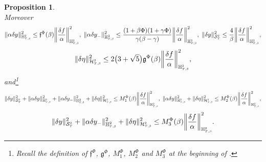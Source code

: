 \documentclass[10pt]{article} %
\newtheorem{proposition}[theorem]{Proposition}
\newcommand\cH{\mathcal H}
\newcommand\cS{\mathcal S}
\newcommand{\smalltext}[1]{\text{\fontsize{4}{4}\selectfont$#1$}}
\newcommand\ff{\mathfrak f}
\newcommand\fg{\mathfrak g}
\def \H{\mathbb{H}}
\newcommand{\etaconst}{2\big(3 + \sqrt{5}\big)}
\begin{document}
\begin{proposition}
\begin{equation*}
	\end{equation*}
	Moreover
	\begin{equation*}
			\|\alpha \delta y\|^2_{\H^{\smalltext{2}}_{\smalltext{T}\smalltext{,}\smalltext{\beta}}} 
			\leq \ff^\Phi(\beta) \bigg\| \frac{\delta f}{\alpha} \bigg\|^2_{\H^{\smalltext{2}}_{\smalltext{T}\smalltext{,}\smalltext{\beta}}},
			\;
			\|\alpha \delta y_-\|^2_{\H^2_{\smalltext{T}\smalltext{,}\smalltext{\beta}}} 
			\leq \frac{(1+\beta\Phi)(1+\gamma\Phi)}{\gamma(\beta - \gamma)} \bigg\|\frac{\delta f}{\alpha}\bigg\|^2_{\mathbb{H}^\smalltext{2}_{\smalltext{T}\smalltext{,}\smalltext{\beta}}},
			\;
			\|\delta y\|^2_{\cS^\smalltext{2}_\smalltext{T}} \leq \frac{4}{\beta} \bigg\| \frac{\delta f}{\alpha} \bigg\|^2_{\H^{\smalltext{2}}_{\smalltext{T}\smalltext{,}\smalltext{\beta}}},
	\end{equation*}
	\begin{equation*}
		\|\delta\eta\|^2_{\cH^\smalltext{2}_{\smalltext{T}\smalltext{,}\smalltext{\beta}}} \leq \etaconst\fg^\Phi(\beta)\bigg\| \frac{\delta f}{\alpha} \bigg\|^2_{\H^{\smalltext{2}}_{\smalltext{T}\smalltext{,}\smalltext{\beta}}},
	\end{equation*}
	and\footnote{Recall the definition of $\ff^\Phi$, $\fg^\Phi$, $M^\Phi_1$, $M^\Phi_2$ and $M^\Phi_3$ at the beginning of .}
	\begin{equation*}
		\|\delta y\|^2_{\cS^\smalltext{2}_\smalltext{T}} + \|\alpha \delta y\|^2_{\H^{\smalltext{2}}_{\smalltext{T}\smalltext{,}\smalltext{\beta}}} + \|\alpha \delta y_-\|^2_{\H^2_{\smalltext{T}\smalltext{,}\smalltext{\beta}}} + \|\delta\eta\|^2_{\cH^{\smalltext{2}}_{\smalltext{T}\smalltext{,}\smalltext{\beta}}} 
		\leq M^\Phi_1(\beta) \bigg\| \frac{\delta f}{\alpha} \bigg\|^2_{\H^{\smalltext{2}}_{\smalltext{T}\smalltext{,}\smalltext{\beta}}},
		\;
		\|\alpha \delta y\|^2_{\H^{\smalltext{2}}_{\smalltext{T}\smalltext{,}\smalltext{\beta}}} + \|\delta\eta\|^2_{\cH^{\smalltext{2}}_{\smalltext{T}\smalltext{,}\smalltext{\beta}}} 
		\leq M^\Phi_2(\beta) \bigg\| \frac{\delta f}{\alpha} \bigg\|^2_{\H^{\smalltext{2}}_{\smalltext{T}\smalltext{,}\smalltext{\beta}}},
	\end{equation*}
	\begin{equation*}
		\|\delta y\|^2_{\cS^\smalltext{2}_\smalltext{T}} + \|\alpha \delta y_-\|^2_{\H^2_{\smalltext{T}\smalltext{,}\smalltext{\beta}}} + \|\delta\eta\|^2_{\cH^{\smalltext{2}}_{\smalltext{T}\smalltext{,}\smalltext{\beta}}} 
		\leq M^\Phi_3(\beta) \bigg\| \frac{\delta f}{\alpha} \bigg\|^2_{\H^{\smalltext{2}}_{\smalltext{T}\smalltext{,}\smalltext{\beta}}}.
	\end{equation*}
\end{proposition}
	
\end{document}
